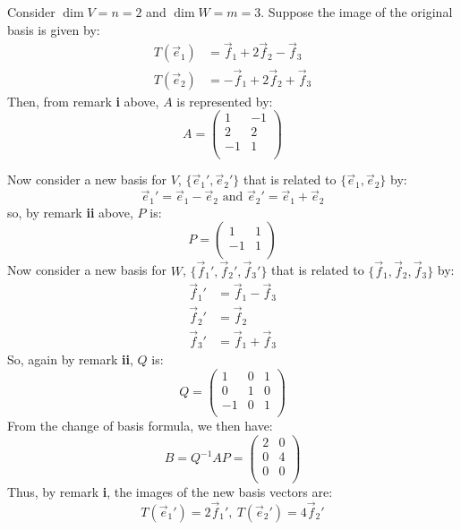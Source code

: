 \documentclass[../main.tex]{subfiles}
\begin{document}
\begin{example}
  Consider $\dim V = n = 2$ and $\dim W = m = 3$.
  Suppose the image of the original basis is given by:
  \begin{align*}
    T(\vec{e}_1) &= \vec{f}_1  + 2\vec{f}_2 - \vec{f}_3 \\
    T(\vec{e}_2) &= -\vec{f}_1  + 2\vec{f}_2 + \vec{f}_3
  \end{align*}
  Then, from remark \textbf{i} above, $A$ is represented by:
  \[
    A = \begin{pmatrix}
    1 & -1 \\
    2 & 2 \\
    -1 & 1 \\
    \end{pmatrix}
  \]

  Now consider a new basis for $V$, $\{\vec{e}_1', \vec{e}_2'\}$ that is related to $\{\vec{e}_1, \vec{e}_2\}$ by:
  \[
    \vec{e}_1' = \vec{e}_1 - \vec{e}_2 \text{ and } \vec{e}_2' = \vec{e}_1 + \vec{e}_2
  \]
  so, by remark \textbf{ii} above, $P$ is:
  \[
    P = \begin{pmatrix}
    1 & 1 \\
    -1 & 1 \\
    \end{pmatrix}
  \]
  Now consider a new basis for $W$, $\{\vec{f}_1', \vec{f}_2', \vec{f}_3'\}$ that is related to $\{\vec{f}_1, \vec{f}_2, \vec{f}_3\}$ by:
  \begin{align*}
    \vec{f}_1' &= \vec{f}_1 - \vec{f}_3 \\
    \vec{f}_2' &= \vec{f}_2 \\
    \vec{f}_3' &= \vec{f}_1 + \vec{f}_3
  \end{align*}
  So, again by remark \textbf{ii}, $Q$ is:
  \[
    Q = \begin{pmatrix}
    1 & 0 & 1 \\
    0 & 1 & 0 \\
    -1 & 0 & 1 \\
    \end{pmatrix}
  \]
  From the change of basis formula, we then have:
  \[
    B = Q^{-1}AP = \begin{pmatrix}
    2 & 0 \\
    0 & 4 \\
    0 & 0 \\
    \end{pmatrix}
  \]
  Thus, by remark \textbf{i}, the images of the new basis vectors are:
  \[
    T(\vec{e}_1') = 2\vec{f}_1',\ T(\vec{e}_2') = 4\vec{f}_2'
  \]

\end{example}
\end{document}
